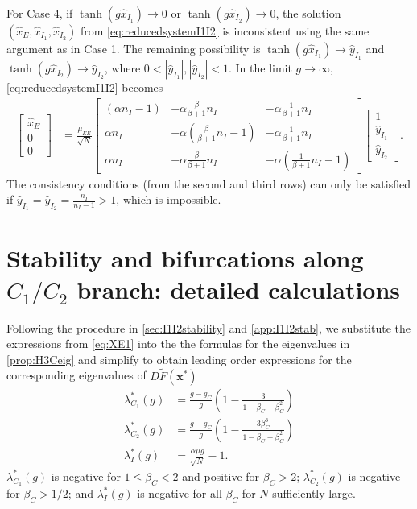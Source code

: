 \documentclass[reqno]{siamonline190516}
\newcommand{\xvec}{\mathbf{x}}
\begin{document}
For Case 4, if $\tanh( g \hat{x}_{I_1} ) \rightarrow 0$ or $\tanh( g \hat{x}_{I_2} ) \rightarrow 0$, the solution $(\hat{x}_E, \hat{x}_{I_1}, \hat{x}_{I_2})$ from \cref{eq:reducedsystemI1I2} is inconsistent using the same argument as in Case 1. The remaining possibility is $\tanh( g \hat{x}_{I_1} ) \rightarrow \hat{y}_{I_1}$  and $\tanh( g \hat{x}_{I_2} ) \rightarrow \hat{y}_{I_2}$, where $0 < |\hat{y}_{I_1}| , |\hat{y}_{I_2}| < 1$. In the limit $g \rightarrow \infty$, \cref{eq:reducedsystemI1I2} becomes
\begin{equation*}
 \begin{aligned}
 \begin{bmatrix} \hat{x}_E \\ 0 \\ 0 \end{bmatrix} 
 &= \frac{\mu_{EE}}{\sqrt{N}} 
 \begin{bmatrix} (\alpha n_I - 1) & -\alpha \frac{\beta}{\beta+1} n_I & - \alpha \frac{1}{\beta+1} n_I  \\
    \alpha n_I  & -\alpha \left(\frac{\beta}{\beta+1} n_I-1\right) & - \alpha \frac{1}{\beta+1} n_I  \\
    \alpha n_I & -\alpha \frac{\beta}{\beta+1} n_I & -\alpha \left(\frac{1}{\beta+1} n_I-1\right)
 \end{bmatrix}
 \begin{bmatrix} 1 \\ \hat{y}_{I_1} \\ \hat{y}_{I_2} \end{bmatrix}.
 \end{aligned}
 \end{equation*}
 The consistency conditions (from the second and third rows) can only be satisfied if $\hat{y}_{I_1} = \hat{y}_{I_2} = \frac{n_I}{n_I - 1} > 1$, which is impossible.

\section{Stability and bifurcations along \texorpdfstring{$C_1/C_2$}{C1/C2} branch: detailed calculations}\label{app:C1C2stability}

Following the procedure in \cref{sec:I1I2stability} and \cref{app:I1I2stab}, we substitute the expressions from \cref{eq:XE1} into the the formulas for the eigenvalues in \cref{prop:H3Ceig} and simplify to obtain leading order expressions for the corresponding eigenvalues of $D\tilde{F}(\xvec^*)$
\begin{equation}\label{eq:DFclustereigs}
\begin{aligned}
\lambda_{C_1}^*(g) &= \frac{g-g_C}{g} \left( 1 - \frac{3}{1-\beta_C+\beta_C^2 }\right) \\
\lambda_{C_2}^*(g) &= \frac{g-g_C}{g} \left( 1 - \frac{3 \beta_C^3}{1-\beta_C+\beta_C^2 }\right) \\
\lambda_{I}^*(g) &= \frac{\alpha \mu g}{\sqrt{N}} - 1.
\end{aligned}
\end{equation}
$\lambda_{C_1}^*(g)$ is negative for $1 \leq \beta_C < 2$ and positive for $\beta_C > 2$; $\lambda_{C_2}^*(g)$ is negative for $\beta_C  > 1/2$; and $\lambda_{I}^*(g)$ is negative for all $\beta_C$ for $N$ sufficiently large.
\end{document}

